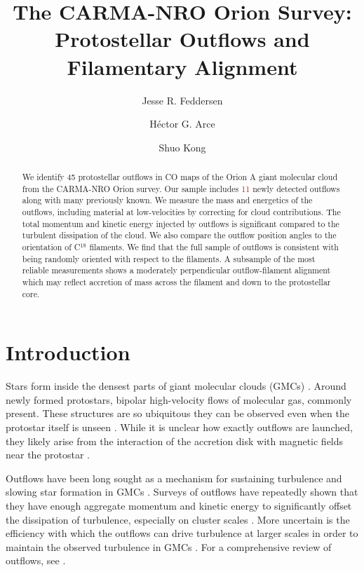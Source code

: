 \documentclass[twocolumn]{aastex63}
\newcommand{\numnew}{11}
\begin{document}
\title{The CARMA-NRO Orion Survey: Protostellar Outflows and Filamentary Alignment}

\author{Jesse R. Feddersen}
\author{H\'ector G. Arce}
\author{Shuo Kong}


\begin{abstract}
We identify 45 protostellar outflows in CO maps of the Orion A giant molecular cloud from the CARMA-NRO Orion survey. Our sample includes \textcolor{red}{\numnew{}} newly detected outflows along with many previously known. We measure the mass and energetics of the outflows, including material at low-velocities by correcting for cloud contributions. The total momentum and kinetic energy injected by outflows is significant compared to the turbulent dissipation of the cloud. We also compare the outflow position angles to the orientation of C$^{18}$ filaments. We find that the full sample of outflows is consistent with being randomly oriented with respect to the filaments. A subsample of the most reliable measurements shows a moderately perpendicular outflow-filament alignment which may reflect accretion of mass across the filament and down to the protostellar core.
\end{abstract}


\section{Introduction}
Stars form inside the densest parts of giant molecular clouds (GMCs) \citet{McKee07}. Around newly formed protostars, bipolar high-velocity flows of molecular gas, commonly present. These structures are so ubiquitous they can be observed even when the protostar itself is unseen \citep{Kong19}. While it is unclear how exactly outflows are launched, they likely arise from the interaction of the accretion disk with magnetic fields near the protostar \citep[e.g.][]{Konigl00,Shu00,Frank14}.

Outflows have been long sought as a mechanism for sustaining turbulence and slowing star formation in GMCs \citep{Nakamura07,Carroll09,Federrath15}. Surveys of outflows have repeatedly shown that they have enough aggregate momentum and kinetic energy to significantly offset the dissipation of turbulence, especially on cluster scales \citep{Arce10,Nakamura11,Plunkett13,Plunkett15,Li15}. More uncertain is the efficiency with which the outflows can drive turbulence at larger scales in order to maintain the observed turbulence in GMCs \citep{Brunt09,Padoan09,Carroll10}. For a comprehensive review of outflows, see \citet{Bally16}.
\end{document}
